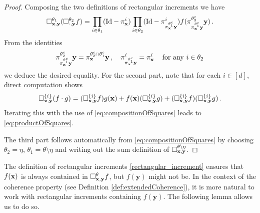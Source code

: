 \documentclass[12pt]{article}
\numberwithin{equation}{section}
\theoremstyle{plain}
\theoremstyle{definition}
\newcommand{\Id}{\mbox{Id}}
\def\fy{\mathbf y}\def\fz{\mathbf z}
\begin{document}
\begin{proof}
Composing the two definitions of rectangular increments we have 
\[ \square_{\fx,\fy}^{\theta_1}(\square_{\cdot,\fy}^{\theta_2} f ) =\prod_{i\in\theta_1}(\text{Id} - \pi^i_{\fx}) \prod_{i\in\theta_2}(\text{Id} - \pi^i_{\pi^{\theta_1^c}_{\fx}\fy})f(\pi^{\theta_2^c}_{\pi^{\theta_1^c}_{\fx}\fy}\fy)\,.\]
From the identities
\[\pi^{\theta_2^c}_{\pi^{\theta_1^c}_{\fx}\fy}\fy=\pi^{\theta_2^c\cap \theta_1^c}_{\fx}\fy\,, \quad \pi^i_{\pi^{\theta_1^c}_{\fx}\fy}= \pi^i_{\fx}\, \quad \text{for any $i\in \theta_2$}\] 
we deduce the desired equality. For the second part, note that for each $i\in[d]$, direct computation shows
\[
\square^{\{i\}}_{\fx,\fy}(f\cdot g) = (\square^{\{i\}}_{\fx,\fy} f) g(\fx) + f(\fx)(\square^{\{i\}}_{\fx,\fy} g) + (\square^{\{i\}}_{\fx,\fy} f) (\square^{\{i\}}_{\fx,\fy} g)\,.
\]
Iterating this with the use of \eqref{eq:compositionOfSquares} leads to \eqref{eq:productOfSquares}.

The third part follows automatically from \eqref{eq:compositionOfSquares} by choosing $\theta_2 = \eta$, $\theta_1 = \theta\setminus\eta$ and writing out the sum definition of $\square_{\fx,\fy}^{\theta\setminus\eta}$.
\end{proof}


%

The definition of rectangular increments \eqref{rectangular_increment} ensures that $f(\mathbf x)$ is always contained in $\square^\theta_{\fx,\fy} f$, but $f(\fy)$ might not be. In the context of the coherence property (see Definition \ref{def:extendedCoherence}), it is more natural to work with rectangular increments containing $f(\fy)$. The following lemma allows us to do so.
\end{document}
